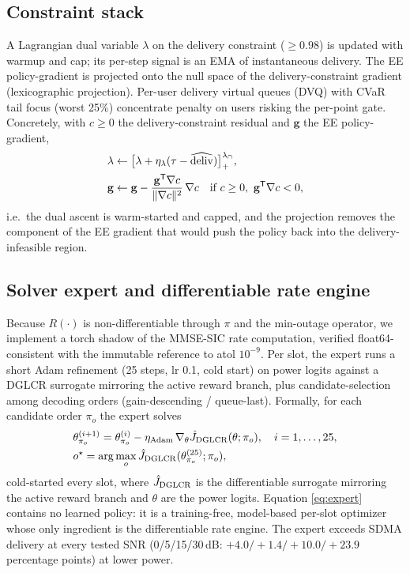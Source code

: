 \documentclass[journal]{IEEEtran}
\newcommand{\vect}[1]{\mathbf{#1}}
\begin{document}
\subsection{Constraint stack}
A Lagrangian dual variable $\lambda$ on the delivery constraint ($\ge0.98$) is
updated with warmup and cap; its per-step signal is an EMA of instantaneous
delivery. The EE policy-gradient is projected onto the null space of the
delivery-constraint gradient (lexicographic projection). Per-user delivery
virtual queues (DVQ) with CVaR tail focus (worst 25\%) concentrate penalty on
users risking the per-point gate. Concretely, with $c\ge0$ the delivery-constraint
residual and $\vect{g}$ the EE policy-gradient,
\begin{equation}
\begin{split}
&\lambda \leftarrow \big[\lambda + \eta_\lambda(\tau - \widehat{\mathrm{deliv}})\big]_+^{\lambda_\cap},\\
&\vect{g} \leftarrow \vect{g} - \frac{\vect{g}^{\sf T}\nabla c}{\|\nabla c\|^2}\,\nabla c
\quad \text{if } c\ge 0,\ \vect{g}^{\sf T}\nabla c < 0,
\end{split}
\label{eq:lagproj}
\end{equation}
i.e.\ the dual ascent is warm-started and capped, and the projection removes the
component of the EE gradient that would push the policy back into the
delivery-infeasible region.

\subsection{Solver expert and differentiable rate engine}
Because $R(\cdot)$ is non-differentiable through $\pi$ and the min-outage
operator, we implement a torch shadow of the MMSE-SIC rate computation, verified
float64-consistent with the immutable reference to atol $10^{-9}$. Per slot, the
expert runs a short Adam refinement (25 steps, lr 0.1, cold start) on power logits
against a DGLCR surrogate mirroring the active reward branch, plus
candidate-selection among decoding orders (gain-descending / queue-last).
Formally, for each candidate order $\pi_o$ the expert solves
\begin{equation}
\begin{split}
&\theta^{(i+1)}_{\pi_o} = \theta^{(i)}_{\pi_o} - \eta_{\rm Adam}\,
\nabla_\theta \hat{J}_{\rm DGLCR}(\theta;\pi_o),\quad i=1,\dots,25,\\
&o^\star = \arg\max_o \hat{J}_{\rm DGLCR}(\theta^{(25)}_{\pi_o};\pi_o),
\end{split}
\label{eq:expert}
\end{equation}
cold-started every slot, where $\hat{J}_{\rm DGLCR}$ is the differentiable
surrogate mirroring the active reward branch and $\theta$ are the power logits.
Equation \eqref{eq:expert} contains no learned policy: it is a training-free,
model-based per-slot optimizer whose only ingredient is the differentiable rate
engine. The expert exceeds SDMA delivery at every tested SNR (0/5/15/30\,dB:
$+4.0/+1.4/+10.0/+23.9$ percentage points) at lower power.
\end{document}
